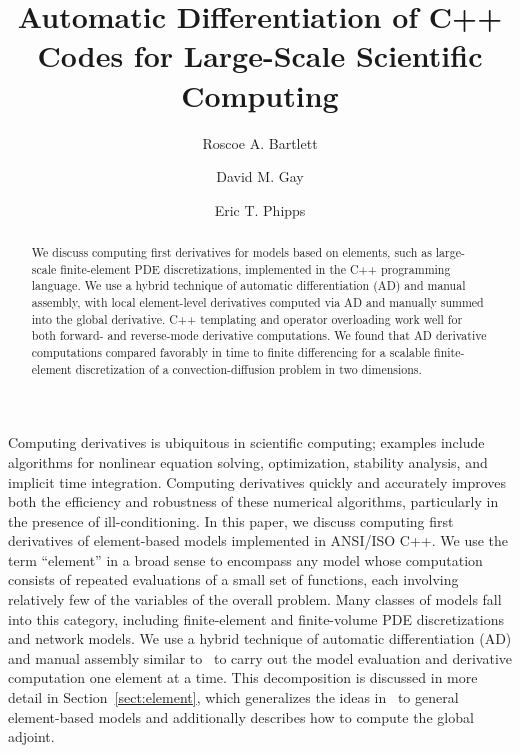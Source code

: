\documentclass{llncs}
\begin{document}
\frontmatter
\pagestyle{headings}


\mainmatter

\title{Automatic Differentiation of C++ Codes for Large-Scale Scientific Computing}

\author{Roscoe A. Bartlett \and David M. Gay \and Eric T. Phipps}



\maketitle

\begin{abstract}
We discuss computing first derivatives for models based on elements,
such as large-scale
finite-element PDE discretizations, implemented in the C++ programming
language.  We use a hybrid technique of automatic differentiation (AD)
and manual assembly, with local element-level derivatives computed via AD and
manually summed into the global derivative.  C++ templating and
operator overloading work well for both forward- and reverse-mode derivative
computations.
We found that AD
derivative computations compared favorably in time to finite differencing
for a scalable
finite-element discretization of a
convection-diffusion problem in two dimensions.
\end{abstract}

Computing derivatives is ubiquitous in scientific computing; examples
include algorithms for nonlinear equation solving, optimization, stability analysis,
and implicit time integration.  Computing derivatives quickly and
accurately improves both the efficiency and
robustness of these numerical algorithms, particularly in the presence
of ill-conditioning.  In this paper, we discuss computing first
derivatives of element-based models implemented in ANSI/ISO C++.  We
use the term ``element'' in a broad sense to encompass any model whose
computation consists of repeated evaluations of a small set of
functions, each involving relatively few of the variables
of the overall problem.
Many classes of models fall into this category, including
finite-element and finite-volume PDE discretizations and network
models.  We use a hybrid technique of automatic differentiation (AD)
and manual assembly similar
to~\cite{Abate2001IAw,Tijskens2002ADf} to carry out the model evaluation and
derivative computation one element at a time.  This
decomposition is discussed in more detail in
Section~\ref{sect:element}, which generalizes the ideas
in~\cite{Tijskens2002ADf} to general element-based models and
additionally describes how to compute the global adjoint.
\end{document}
